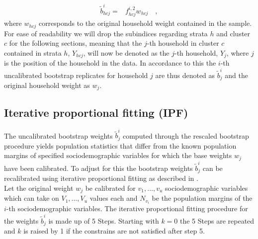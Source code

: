 \documentclass{scrartcl}\usepackage[]{graphicx}\usepackage[]{color}
\begin{document}
\begin{align*}
  \tilde{b}_{hcj}^{i} =& f^{i,2}_{hcj} w_{hcj} \quad,
\end{align*}
where $w_{hcj}$ corresponds to the original household weight contained in the sample.\\

For ease of readability we will drop the subindices regarding strata $h$ and cluster $c$ for the following sections, meaning that the $j$-th household in cluster $c$ contained in strata $h$, $Y_{hcj}$, will now be denoted as the $j$-th household, $Y_{j}$, where $j$ is the position of the household in the data. In accordance to this the $i$-th uncalibrated bootstrap replicates for household $j$ are thus denoted as $\tilde{b}_j^{i}$ and the original household weight as $w_j$.


\subsection{Iterative proportional fitting (IPF)}
The uncalibrated bootstrap weights $\tilde{b}_j^{i}$ computed through the rescaled bootstrap procedure yields population statistics that differ from the known population margins of specified sociodemographic variables for which the base weights $w_j$ have been calibrated. To adjust for this the bootstrap weights $\tilde{b}_{j}^{i}$ can be recalibrated using iterative proportional fitting as described in \citep{mekogu2016}.\\

Let the original weight $w_{j}$ be calibrated for $v_1,\ldots,v_u$ sociodemographic variables which can take on $V_1,\ldots,V_u$ values each and $N_{v_i}$ be the population margins of the $i$-th sociodemographic variables. The iterative proportional fitting procedure for the weights $\tilde{b}_j^{i}$ is made up of 5 Steps. Starting with $k=0$ the 5 Steps are repeated and $k$ is raised by 1 if the constrains are not satisfied after step 5.
\end{document}
